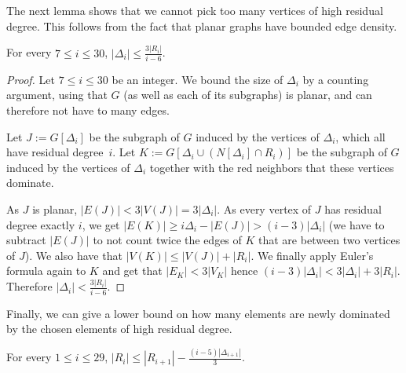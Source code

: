 The next lemma shows that we cannot pick too many vertices of high
residual degree. This follows from the fact that planar graphs have
bounded edge density.

\begin{lemma}\label{lem:delta}
  For every $7\le i\le 30$, $|\Delta_i| \le \frac{3|R_i|}{i-6}$.
\end{lemma}
\begin{proof}
  Let $7\le i\le 30$ be an integer. We bound the size of $\Delta_i$
  by a counting argument, using that $G$ (as well as each of its
  subgraphs) is planar, and can therefore not have to many edges.

  Let $J := G[\Delta_i]$ be the subgraph of $G$ induced by the
  vertices of $\Delta_i$, which all have residual degree~$i$. Let
  $K := G[\Delta_i \cup (N[\Delta_i]\cap R_i)]$ be the subgraph of $G$
  induced by the vertices of $\Delta_i$ together with the red
  neighbors that these vertices dominate.

  As $J$ is planar, $|E(J)| < 3|V(J)| = 3|\Delta_i|$. As every
  vertex of $J$ has residual degree exactly $i$, we get
  $|E(K)| \geq i\Delta_i - |E(J)| > (i-3)|\Delta_i|$ (we have to
  subtract $|E(J)|$ to not count twice the edges of $K$ that are
  between two vertices of $J$).  We also have that
  $|V(K)| \le |V(J)| + |R_i|$. We finally apply Euler's formula again
  to $K$ and get that $|E_K| < 3|V_K|$ hence
  $(i-3)|\Delta_i| < 3|\Delta_i| + 3|R_i|$. Therefore
  $|\Delta_i|< \frac{3|R_i|}{i-6}$.
\end{proof}

Finally, we can give a lower bound on how many elements are newly
dominated by the chosen elements of high residual degree.

\begin{lemma}\label{lem:h2}
  For every $1\leq i\leq 29$, $|R_i| \le |R_{i+1}| - \frac{(i-5)|\Delta_{i+1}|}{3}$.
\end{lemma}


